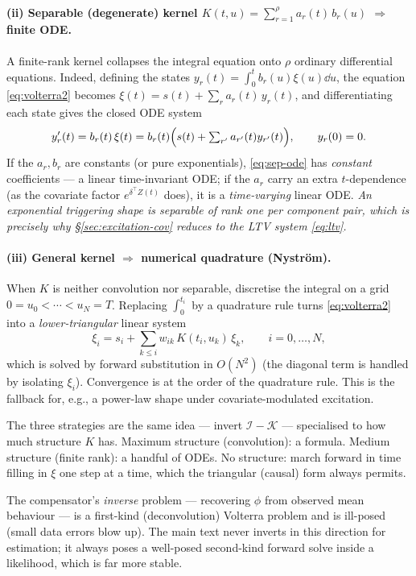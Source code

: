 \paragraph{(ii) Separable (degenerate) kernel
$K(t,u)=\sum_{r=1}^{\rho}a_r(t)\,b_r(u)$ $\Rightarrow$ finite ODE.}
A finite-rank kernel collapses the integral equation onto $\rho$ ordinary
differential equations. Indeed, defining the states $y_r(t)=\int_0^t b_r(u)\xi(u)\dd u$,
the equation \eqref{eq:volterra2} becomes $\xi(t)=s(t)+\sum_r a_r(t)\,y_r(t)$, and
differentiating each state gives the closed ODE system
\begin{equation}
y_r'(t)=b_r(t)\,\xi(t)=b_r(t)\Bigl(s(t)+\textstyle\sum_{r'}a_{r'}(t)y_{r'}(t)\Bigr),
\qquad y_r(0)=0.
\label{eq:sep-ode}
\end{equation}
If the $a_r,b_r$ are constants (or pure exponentials), \eqref{eq:sep-ode} has
\emph{constant} coefficients --- a linear time-invariant ODE; if the $a_r$ carry an
extra $t$-dependence (as the covariate factor $e^{\delta^\top Z(t)}$ does), it is a
\emph{time-varying} linear ODE. \emph{An exponential triggering shape is separable
of rank one per component pair, which is precisely why
\S\ref{sec:excitation-cov} reduces to the LTV system \eqref{eq:ltv}.}

\paragraph{(iii) General kernel $\Rightarrow$ numerical quadrature (Nyström).}
When $K$ is neither convolution nor separable, discretise the integral on a grid
$0=u_0<\cdots<u_N=T$. Replacing $\int_0^{t_i}$ by a quadrature rule turns
\eqref{eq:volterra2} into a \emph{lower-triangular} linear system
\begin{equation}
\xi_i = s_i + \sum_{k\le i} w_{ik}\,K(t_i,u_k)\,\xi_k,\qquad i=0,\dots,N,
\end{equation}
which is solved by forward substitution in $O(N^2)$ (the diagonal term is handled
by isolating $\xi_i$). Convergence is at the order of the quadrature rule. This is
the fallback for, e.g., a power-law shape under covariate-modulated excitation.

\begin{intuition}
The three strategies are the same idea --- invert $\mathcal I-\mathcal K$ ---
specialised to how much structure $K$ has. Maximum structure (convolution): a
formula. Medium structure (finite rank): a handful of ODEs. No structure: march
forward in time filling in $\xi$ one step at a time, which the triangular
(causal) form always permits.
\end{intuition}

\begin{remark}
The compensator's \emph{inverse} problem --- recovering $\phi$ from observed mean
behaviour --- is a first-kind (deconvolution) Volterra problem and is ill-posed
(small data errors blow up). The main text never inverts in this direction for
estimation; it always poses a well-posed second-kind forward solve inside a
likelihood, which is far more stable.
\end{remark}
